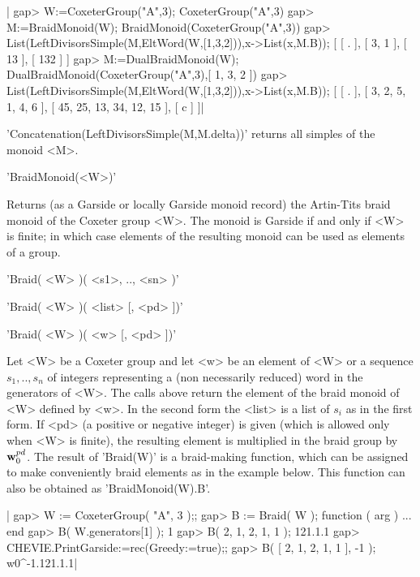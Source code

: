 |    gap> W:=CoxeterGroup("A",3);
    CoxeterGroup("A",3)
    gap> M:=BraidMonoid(W);
    BraidMonoid(CoxeterGroup("A",3))
    gap> List(LeftDivisorsSimple(M,EltWord(W,[1,3,2])),x->List(x,M.B));
    [ [ . ], [ 3, 1 ], [ 13 ], [ 132 ] ]
    gap> M:=DualBraidMonoid(W);
    DualBraidMonoid(CoxeterGroup("A",3),[ 1, 3, 2 ])
    gap> List(LeftDivisorsSimple(M,EltWord(W,[1,3,2])),x->List(x,M.B));
    [ [ . ], [ 3, 2, 5, 1, 4, 6 ], [ 45, 25, 13, 34, 12, 15 ], [ c ] ]|

'Concatenation(LeftDivisorsSimple(M,M.delta))'  returns all  simples of the
monoid <M>.


'BraidMonoid(<W>)'

Returns (as a  Garside or locally Garside monoid  record) the Artin-Tits
braid monoid of the Coxeter group <W>. The monoid is Garside if and only
if <W> is finite; in which case  elements of the resulting monoid can be
used as elements of a group.


'Braid( <W> )( <s1>, .., <sn> )'

'Braid( <W> )( <list> [, <pd> ])'

'Braid( <W> )( <w> [, <pd> ])'

Let  <W> be a Coxeter group and let <w>  be an element of <W> or a sequence
$s_1,..,s_n$  of integers representing a  (non necessarily reduced) word in
the  generators of  <W>. The  calls above  return the  element of the braid
monoid  of <W> defined by <w>.  In the second form the  <list> is a list of
$s_i$  as in the  first form. If  <pd> (a positive  or negative integer) is
given  (which is allowed only when <W> is finite), the resulting element is
multiplied  in the braid group by ${\bf w}_0^{pd}$. The result of 'Braid(W)' is
a  braid-making function, which can be  assigned to make conveniently braid
elements  as in the  example below. This  function can also  be obtained as
'BraidMonoid(W).B'.

|    gap> W := CoxeterGroup( "A", 3 );;
    gap> B := Braid( W );
    function ( arg ) ... end
    gap> B( W.generators[1] );
    1
    gap> B( 2, 1, 2, 1, 1 );
    121.1.1
    gap> CHEVIE.PrintGarside:=rec(Greedy:=true);;
    gap> B( [ 2, 1, 2, 1, 1 ], -1 );
    w0^-1.121.1.1|

